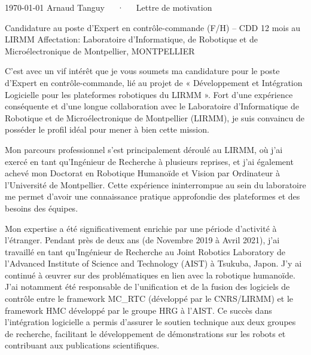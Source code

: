\documentclass[11pt, a4paper]{awesome-cv}
\begin{document}
\makecvheader[R]

\makecvfooter
{\today}
{Arnaud Tanguy~~~·~~~Lettre de motivation}
{}

\recipient
{Candidature au poste d'Expert en contrôle-commande (F/H) – CDD 12 mois au LIRMM}
{Affectation: Laboratoire d'Informatique, de Robotique et de Microélectronique de Montpellier, MONTPELLIER}

\makelettertitle

\begin{cvletter}

  C’est avec un vif intérêt que je vous soumets ma candidature pour le poste d'Expert en contrôle-commande,
  lié au projet de « Développement et Intégration Logicielle pour les plateformes robotiques du LIRMM ». Fort
  d'une expérience conséquente et d’une longue collaboration avec le Laboratoire d'Informatique de Robotique
  et de Microélectronique de Montpellier (LIRMM), je suis convaincu de posséder le profil idéal pour mener à
  bien cette mission.

  Mon parcours professionnel s’est principalement déroulé au LIRMM, où j’ai exercé en tant qu’Ingénieur de
  Recherche à plusieurs reprises, et j'ai également achevé mon Doctorat en Robotique Humanoïde et Vision par
  Ordinateur à l’Université de Montpellier. Cette expérience ininterrompue au sein du laboratoire me permet
  d’avoir une connaissance pratique approfondie des plateformes et des besoins des équipes.

  Mon expertise a été significativement enrichie par une période d'activité à l'étranger. Pendant près de
  deux ans (de Novembre 2019 à Avril 2021), j'ai travaillé en tant qu'Ingénieur de Recherche au Joint
  Robotics Laboratory de l'Advanced Institute of Science and Technology (AIST) à Tsukuba, Japon. J'y ai
  continué à œuvrer sur des problématiques en lien avec la robotique humanoïde. J'ai notamment été
  responsable de l’unification et de la fusion des logiciels de contrôle entre le framework MC\_RTC
  (développé par le CNRS/LIRMM) et le framework HMC développé par le groupe HRG à l’AIST. Ce succès dans
  l'intégration logicielle a permis d'assurer le soutien technique aux deux groupes de recherche, facilitant
  le développement de démonstrations sur les robots et contribuant aux publications scientifiques.


\end{cvletter}
\end{document}
